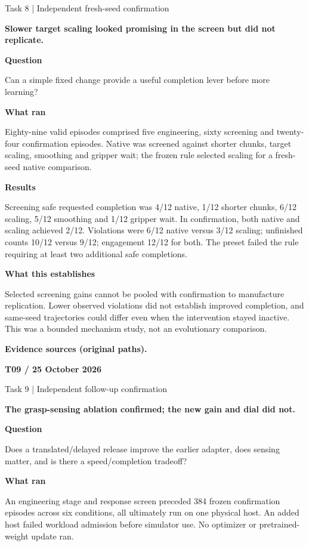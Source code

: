 \documentclass[11pt,a4paper]{article}
\newcommand{\block}[2]{\par\textbf{\color{ink}#1}\par\nopagebreak #2\par}
\newcommand{\finding}[1]{\begin{tcolorbox}[colback=pale,colframe=pale,boxrule=0pt,arc=1mm,left=10pt,right=10pt,top=10pt,bottom=10pt]\color{ink}\large\bfseries #1\end{tcolorbox}}
\begin{document}
{\color{muted}\small Task 8 | Independent fresh-seed confirmation}\par\vspace{2mm}
\finding{Slower target scaling looked promising in the screen but did not replicate.}
\block{Question}{Can a simple fixed change provide a useful completion lever before more learning?}
\block{What ran}{Eighty-nine valid episodes comprised five engineering, sixty screening and twenty-four confirmation episodes. Native was screened against shorter chunks, target scaling, smoothing and gripper wait; the frozen rule selected scaling for a fresh-seed native comparison.}
\block{Results}{Screening safe requested completion was 4/12 native, 1/12 shorter chunks, 6/12 scaling, 5/12 smoothing and 1/12 gripper wait. In confirmation, both native and scaling achieved 2/12. Violations were 6/12 native versus 3/12 scaling; unfinished counts 10/12 versus 9/12; engagement 12/12 for both. The preset failed the rule requiring at least two additional safe completions.}
\block{What this establishes}{Selected screening gains cannot be pooled with confirmation to manufacture replication. Lower observed violations did not establish improved completion, and same-seed trajectories could differ even when the intervention stayed inactive. This was a bounded mechanism study, not an evolutionary comparison.}
\vfill{\footnotesize\color{muted}\textbf{Evidence sources (original paths).}\par
\raggedright {}\par {}}
\clearpage
{}\label{exp:T09}
{\color{accent}\small\bfseries T09 / 25 October 2026}\par
{}\par
{\color{muted}\small Task 9 | Independent follow-up confirmation}\par\vspace{2mm}
\finding{The grasp-sensing ablation confirmed; the new gain and dial did not.}
\block{Question}{Does a translated/delayed release improve the earlier adapter, does sensing matter, and is there a speed/completion tradeoff?}
\block{What ran}{An engineering stage and response screen preceded 384 frozen confirmation episodes across six conditions, all ultimately run on one physical host. An added host failed workload admission before simulator use. No optimizer or pretrained-weight update ran.}
\end{document}
